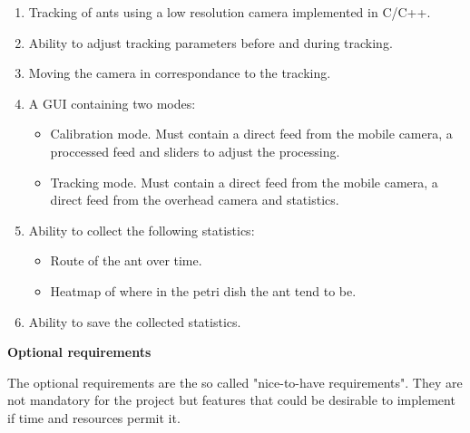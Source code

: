 \begin{enumerate}
    \item Tracking of ants using a low resolution camera implemented in C/C++.
    \item Ability to adjust tracking parameters before and during tracking.
    \item Moving the camera in correspondance to the tracking.
	\item A GUI containing two modes:
    \begin{itemize}
        \item Calibration mode. Must contain a direct feed from the mobile camera, a proccessed feed and sliders to adjust the processing.
        \item Tracking mode. Must contain a direct feed from the mobile camera, a direct feed from the overhead camera and statistics.
    \end{itemize}
    \item Ability to collect the following statistics:
    \begin{itemize}
        \item Route of the ant over time.
        \item Heatmap of where in the petri dish the ant tend to be.
    \end{itemize}
    \item Ability to save the collected statistics.
\end{enumerate}

\noindent \textbf{Optional requirements} \par
The optional requirements are the so called "nice-to-have requirements". They are not mandatory for the project but features that could be desirable to implement if time and resources permit it.

